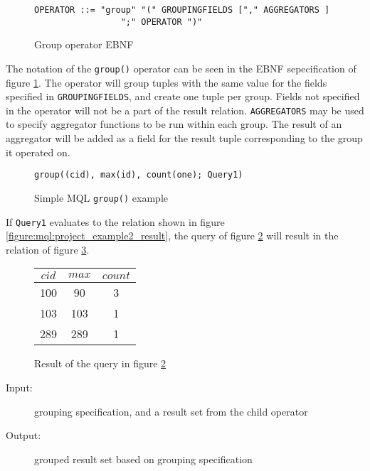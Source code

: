 \begin{figure}[h]
\begin{Verbatim}
OPERATOR ::= "group" "(" GROUPINGFIELDS ["," AGGREGATORS ] 
                 ";" OPERATOR ")"
\end{Verbatim}
\label{figure:mql:groupEBNF}
\caption{Group operator EBNF}
\end{figure}

The notation of the \texttt{group()} operator can be seen in the EBNF sepecification of figure
\ref{figure:mql:groupEBNF}. The operator will group tuples with the same value for the fields specified in
\texttt{GROUPINGFIELDS}, and create one tuple per group. Fields not specified in the operator will not be a part
of the result relation. \texttt{AGGREGATORS} may be used to specify aggregator functions to be run within each
group. The result of an aggregator will be added as a field for the result tuple corresponding to the group it
operated on.

\begin{figure}[h]
\begin{Verbatim}
group((cid), max(id), count(one); Query1)
\end{Verbatim}
\caption{Simple MQL \texttt{group()} example}
\label{figure:mql:groupEx}
\end{figure}

If \texttt{Query1} evaluates to the relation shown in figure \ref{figure:mql:project_example2_result}, the query
of figure \ref{figure:mql:groupEx} will result in the relation of figure \ref{figure:mql:groupres}.

\begin{figure}[!h]
\centering
\begin{tabular}{|c|c|c|} \hline
$cid$ & $max$ & $count$ \\ \hline
100 & 90 & 3 \\ \hline
103 & 103 & 1 \\ \hline
289 & 289 & 1 \\ \hline
\end{tabular}
\caption{Result of the query in figure \ref{figure:mql:groupEx}}
\label{figure:mql:groupres}
\end{figure}

\begin{description}
  \item[Input:] grouping specification, and a result set from the child operator
  \item[Output:] grouped result set based on grouping specification
\end{description}



